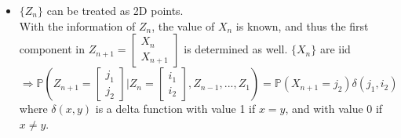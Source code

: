 \documentclass[  11pt]{article}
\begin{document}
\begin{ExerciseList}
\begin{itemize}
$\mathbb{P}(Y_{3} = 2 | Y_{2} = 0,  Y_{1}= 2 )
=\mathbb{P}(X_{3}=1,X_2 = 1 | Y_{2} = 0,  X_{1}= 1, X_0=1 )
=\mathbb{P}(X_{3}=1,X_2 = 1 | X_{2} = -1,  X_{1}= 1, X_0=1 )
=0 $.


$\mathbb{P}(Y_{3} = 2 | Y_{2} = 0,  Y_{1}= -2 )
=\mathbb{P}(X_{3}=1,X_2 = 1 | Y_{2} = 0,  X_{1}= -1, X_0=-1 )
=\mathbb{P}(X_{3}=1,X_2 = 1 | X_{2} = 1,  X_{1}= -1, X_0=-1 )
=p $.

Thus, the conditional probability $\mathbb{P}(Y_{n+1}|Y_{n}, \ldots, Y_1, Y_0)$
can not be determined by the conditional value of  $Y_n$.
$\{Y_n\}$ is not a Markov chain.

{\bf remark}: The trouble for   non-Markovian  comes from the case $\{Y_n=0\}$,
though we have the following result.

For any $n$ and a sequence $j,  i_{n-1},\ldots, i_1\in S$,
$\mathbb{P}(Y_{n+1} =j | Y_n = -2,  Y_{n-1}=i_{n-1}\ldots, Y_1=i_1) = \mathbb{P}(X_{n+1} =j-X_n | X_n=-1,X_{n-1}= -1,
X_{n-1}+X_{n-2}=i_{n-1},\ldots, X_1+X_0=i_1) =  
\mathbb{P}(X_{n+1} = j+1 | X_n=-1,X_{n-1}= -1,
X_{n-1}=i_{n-1}-X_{n-2},\ldots, X_1=i_1-X_0 ,X_0)
=\mathbb{P}(X_{n+1}=j+1)=
  \begin{cases}
p &\mbox{ if }  j=0;
\\  1-p& \mbox{ if }  j=-2; 
\\ 0 &\mbox{ if }  j=2
\end{cases} .$

Similarly, 
$\mathbb{P}(Y_{n+1} = j| Y_n = 2,  Y_{n-1}=i_{n-1}\ldots, Y_1=i_1) = \mathbb{P}(X_{n+1}=j-1)=
\begin{cases}
p &\mbox{ if }  j=2;
\\  1-p& \mbox{ if }  j=0; 
\\ 0 &\mbox{ if }  j=2.
\end{cases} $


 

\item $\{Z_{n}\}$ can be treated as   2D  points. \\

With the information of $Z_n$, the value of $X_n$ is known, and thus the first component  in $Z_{n+1} = \begin{bmatrix} X_{n} \\ X_{n+1}\end{bmatrix}$ is determined as well. $ \{X_n\}$ are iid $\Rightarrow \mathbb{P}(Z_{n+1} = \begin{bmatrix} j_1 \\ j_2 \end{bmatrix} | Z_{n} = \begin{bmatrix} i_1 \\ i_2\end{bmatrix}, Z_{n-1},...,Z_1) = \mathbb{P}(X_{n+1} = j_2) \delta(j_1,i_2)$ where $\delta(x,y)$ is a delta function with value 1 if $x=y$, and with value 0 if $x\neq y$.\\


\end{itemize}
\end{ExerciseList}
\end{document}
